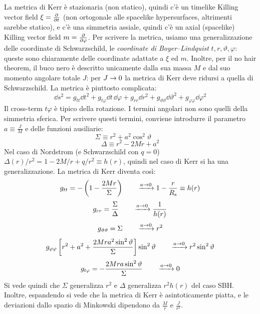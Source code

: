 La metrica di Kerr è stazionaria (non statico), quindi c'è un timelike Killing vector field $ \xi = \frac{\partial}{\partial t} $ (non ortogonale alle spacelike hypersurfaces, altrimenti sarebbe statico), e c'è una simmetria assiale, quindi c'è un axial (spacelike) Killing vector field $ m = \frac{\partial}{\partial \varphi} $. Per scrivere la metrica, usiamo una generalizzazione delle coordinate di Schwarzschild, le \emph{coordinate di Boyer--Lindquist} $ t,r,\vartheta,\varphi $: queste sono chiaramente delle coordinate adattate a $ \xi $ ed $ m $. Inoltre, per il no hair theorem, il buco nero è descritto unicamente dalla sua massa $ M $ e dal suo momento angolare totale $ J $: per $ J \rightarrow 0 $ la metrica di Kerr deve ridursi a quella di Schwarzschild. La metrica è piuttosto complicata:
\begin{equation}
  \dd s^2 = g_{tt} \dd t^2 + g_{t\varphi} \dd t \, \dd \varphi + g_{rr} \dd r^2 + g_{\vartheta \vartheta} \dd \vartheta^2 + g_{\varphi \varphi} \dd \varphi^2
\end{equation}
Il cross-term $ t\varphi $ è tipico della rotazione. I termini angolari non sono quelli della simmetria sferica. Per scrivere questi termini, conviene introdurre il parametro $ a \equiv \frac{J}{M} $ e delle funzioni ausiliarie:
\begin{equation}
  \Sigma \equiv r^2 + a^2 \cos^2 \vartheta
  \qquad
\end{equation}
\begin{equation}
  \Delta \equiv r^2 - 2 M r + a^2
\end{equation}
Nel caso di Nordstrom (e Schwarzschild con $ q = 0 $) $ \Delta(r) / r^2 = 1 - 2M / r + q/r^2 \equiv h(r) $, quindi nel caso di Kerr si ha una generalizzazione. La metrica di Kerr diventa così:
\begin{equation}
  g_{tt} = - \left( 1 - \frac{2 M r}{\Sigma} \right)
  \qquad
  \xrightarrow{a \rightarrow 0} 1 - \frac{r}{R_\text{s}} \equiv h(r)
\end{equation}
\begin{equation}
  g_{rr} = \frac{\Sigma}{\Delta}
  \qquad
  \xrightarrow{a \rightarrow 0} \frac{1}{h(r)}
\end{equation}
\begin{equation}
  g_{\vartheta \vartheta} = \Sigma
  \qquad
  \xrightarrow{a \rightarrow 0} r^2
\end{equation}
\begin{equation}
  g_{\varphi \varphi} \left[ r^2 + a^2 + \frac{2Mr a^2 \sin^2 \vartheta}{\Sigma} \right] \sin^2 \vartheta
  \qquad
  \xrightarrow{a \rightarrow 0} r^2 \sin^2 \vartheta
\end{equation}
\begin{equation}
  g_{t\varphi} = - \frac{2M r a \sin^2\vartheta}{\Sigma}
  \qquad
  \xrightarrow{a \rightarrow 0} 0
\end{equation}
Si vede quindi che $ \Sigma $ generalizza $ r^2 $ e $ \Delta $ generalizza $ r^2 h(r) $ del caso SBH. Inoltre, espandendo si vede che la metrica di Kerr è asintoticamente piatta, e le deviazioni dallo spazio di Minkowski dipendono da $ \frac{M}{r} $ e $ \frac{J}{r^2} $.

